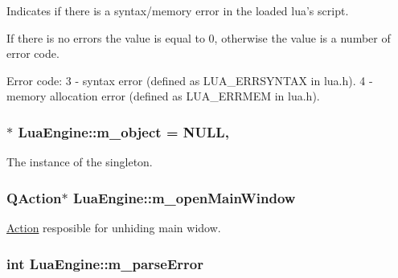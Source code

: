 Indicates if there is a syntax/memory error in the loaded lua's script. 

If there is no errors the value is equal to 0, otherwise the value is a number of error code. \begin{DoxyVerb}            Error code:
            3 - syntax error (defined as LUA_ERRSYNTAX in lua.h).
            4 - memory allocation error (defined as LUA_ERRMEM in lua.h).\end{DoxyVerb}
 \hypertarget{class_lua_engine_a27899d8e22a8da3067519562500b9c7f}{
\subsubsection[{m\-\_\-object}]{ $\ast$ Lua\-Engine\-::m\-\_\-object = N\-U\-L\-L\hspace{0.3cm}{\ttfamily [static]}, {\ttfamily [private]}}}\label{class_lua_engine_a27899d8e22a8da3067519562500b9c7f}


The instance of the singleton. 

\hypertarget{class_lua_engine_ab809b8024722da330a92284b2c01b66a}{
\subsubsection[{m\-\_\-open\-Main\-Window}]{\setlength{\rightskip}{0pt plus 5cm}Q\-Action$\ast$ Lua\-Engine\-::m\-\_\-open\-Main\-Window\hspace{0.3cm}{\ttfamily [private]}}}\label{class_lua_engine_ab809b8024722da330a92284b2c01b66a}


\hyperlink{class_action}{Action} resposible for unhiding main widow. 

\hypertarget{class_lua_engine_ac7c65e343f73a0dadcbe2d5f1a5842f3}{
\subsubsection[{m\-\_\-parse\-Error}]{\setlength{\rightskip}{0pt plus 5cm}int Lua\-Engine\-::m\-\_\-parse\-Error\hspace{0.3cm}{\ttfamily [private]}}}\label{class_lua_engine_ac7c65e343f73a0dadcbe2d5f1a5842f3}


